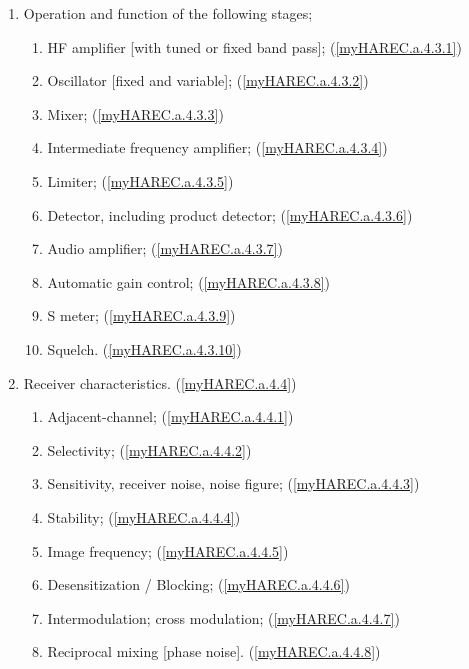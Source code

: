 \begin{enumerate}
\begin{enumerate}
\item Operation and function of the following stages;
\begin{enumerate}
\item HF amplifier [with tuned or fixed band pass];
  (\ref{myHAREC.a.4.3.1})\label{HAREC.a.4.3.1}
\item Oscillator [fixed and variable];
  (\ref{myHAREC.a.4.3.2})\label{HAREC.a.4.3.2}
\item Mixer; (\ref{myHAREC.a.4.3.3})\label{HAREC.a.4.3.3}
\item Intermediate frequency amplifier;
  (\ref{myHAREC.a.4.3.4})\label{HAREC.a.4.3.4}
\item Limiter; (\ref{myHAREC.a.4.3.5})\label{HAREC.a.4.3.5}
\item Detector, including product detector;
  (\ref{myHAREC.a.4.3.6})\label{HAREC.a.4.3.6}
\item Audio amplifier; (\ref{myHAREC.a.4.3.7})\label{HAREC.a.4.3.7}
\item Automatic gain control; (\ref{myHAREC.a.4.3.8})\label{HAREC.a.4.3.8}
\item S meter; (\ref{myHAREC.a.4.3.9})\label{HAREC.a.4.3.9}
\item Squelch. (\ref{myHAREC.a.4.3.10})\label{HAREC.a.4.3.10}
\end{enumerate}

\item Receiver characteristics. (\ref{myHAREC.a.4.4})\label{HAREC.a.4.4}
\begin{enumerate}
\item Adjacent-channel; (\ref{myHAREC.a.4.4.1})\label{HAREC.a.4.4.1}
\item Selectivity; (\ref{myHAREC.a.4.4.2})\label{HAREC.a.4.4.2}
\item Sensitivity, receiver noise, noise figure;
  (\ref{myHAREC.a.4.4.3})\label{HAREC.a.4.4.3}
\item Stability; (\ref{myHAREC.a.4.4.4})\label{HAREC.a.4.4.4}
\item Image frequency; (\ref{myHAREC.a.4.4.5})\label{HAREC.a.4.4.5}
\item Desensitization / Blocking; (\ref{myHAREC.a.4.4.6})\label{HAREC.a.4.4.6}
\item Intermodulation; cross modulation;
  (\ref{myHAREC.a.4.4.7})\label{HAREC.a.4.4.7}
\item Reciprocal mixing [phase noise].
  (\ref{myHAREC.a.4.4.8})\label{HAREC.a.4.4.8}
\end{enumerate}
\end{enumerate}


\end{enumerate}
